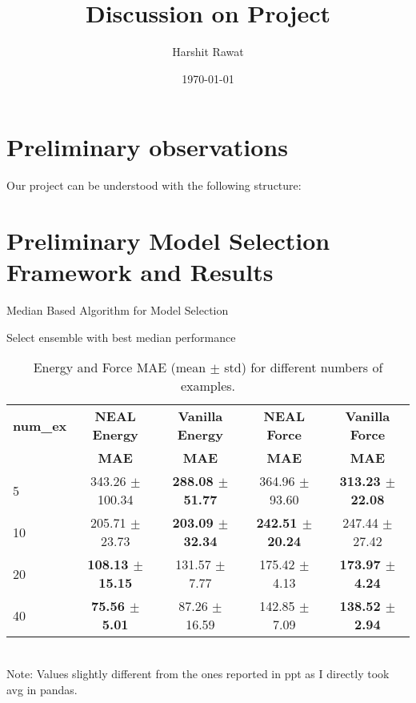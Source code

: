 \documentclass[12pt]{article}
\title{Discussion on Project}
\author{Harshit Rawat}
\date{\today}
\theoremstyle{definition}
\theoremstyle{remark}
\begin{document}
\maketitle
\section{Preliminary observations}
Our project can be understood with the following structure:
\medskip
{}


\newpage
\section{Preliminary Model Selection Framework and Results}
\begin{algorithm}[htbp]
\caption{Median Based Algorithm for Model Selection}\label{alg:Median algorithm}

Select ensemble with best median performance\;
\end{algorithm}
\begin{table}[htbp]
\centering
\small
\caption{Energy and Force MAE (mean $\pm$ std) for different numbers of examples.}
\begin{tabular}{@{}lcccc@{}}
\hline
\textbf{num\_ex} & \textbf{NEAL Energy} & \textbf{Vanilla Energy} & \textbf{NEAL Force} & \textbf{Vanilla Force} \\
& \textbf{MAE} & \textbf{MAE} & \textbf{MAE} & \textbf{MAE} \\
\hline
5  & 343.26 $\pm$ 100.34 & \textbf{288.08 $\pm$ 51.77}  & 364.96 $\pm$ 93.60  & \textbf{313.23 $\pm$ 22.08} \\
10 & 205.71 $\pm$ 23.73  & \textbf{203.09 $\pm$ 32.34}  & \textbf{242.51 $\pm$ 20.24}  & 247.44 $\pm$ 27.42 \\
20 & \textbf{108.13 $\pm$ 15.15}  & 131.57 $\pm$ 7.77   & 175.42 $\pm$ 4.13   & \textbf{173.97 $\pm$ 4.24}  \\
40 & \textbf{75.56  $\pm$ 5.01}   & 87.26  $\pm$ 16.59  & 142.85 $\pm$ 7.09   & \textbf{138.52 $\pm$ 2.94}  \\
\hline
\end{tabular}
\\[5pt] %
Note: Values slightly different from the ones reported in ppt as I directly took avg in pandas.
\end{table}
\end{document}
